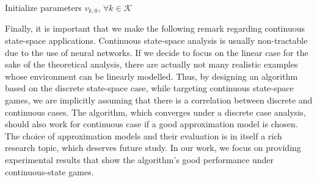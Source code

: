 \documentclass[lettersize,journal]{IEEEtran}
\begin{document}
\begin{algorithm}

\SetAlgoLined
Initialize parameters $v_{k,0}$, $\forall k \in \mathcal{K}$\;
 \caption{Multi-agent $Q$-learning with cooperative exploration for continuous  state spaces (GEA)}
 \label{Algorithm2}
\end{algorithm}

Finally, it is important that we make the following remark regarding continuous state-space applications. Continuous state-space analysis is usually non-tractable due to the use of neural networks. If we decide to focus on the linear case for the sake of the theoretical analysis, there are actually not many realistic examples whose environment can be linearly modelled. Thus, by designing an algorithm based on the discrete state-space case, while targeting continuous state-space games, we are implicitly assuming that there is a correlation  between discrete and continuous cases. The algorithm, which converges under a discrete case analysis, should also work for continuous case if a good approximation model is chosen. The choice of approximation models and their evaluation is in itself a rich research topic, which deserves future study. In our work, we focus on providing experimental results that show the algorithm's good performance under continuous-state games. 


\end{document}
